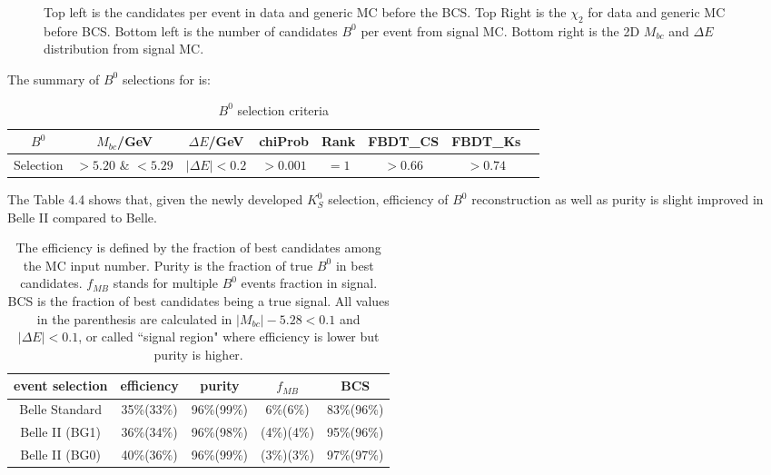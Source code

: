 \begin{figure}[H]
\begin{minipage}[b]{0.5\linewidth}
	\end{minipage}
	
	\caption{Top left is the candidates per event in data and generic MC before the BCS. Top Right is the $\chi_2$ for data and generic MC before BCS. Bottom left is the number of candidates $B^0$ per event from signal MC. Bottom right is the 2D $M_{bc}$ and $\Delta E$ distribution from signal MC.}
	\label{fig:b0dist}
\end{figure}


The summary of $B^0$ selections for is:
\begin{table}[H]
	\centering 
	\begin{tabular}{|c|c|c|c|c|c|c|c|} 
		\hline
		$B^0$  & $M_{bc}$/GeV& $\Delta E$/GeV & chiProb & Rank & FBDT\_CS & FBDT\_Ks\\
		\hline
		Selection & $> 5.20$ \& $< 5.29$  &  $ |\Delta E|< 0.2$ & $> 0.001$  & $=1$ & $>0.66$ & $>0.74$\\
		\hline
	\end{tabular}
	\caption{$B^0$ selection criteria}
\end{table}

The Table 4.4 shows that, given the newly developed $K_S^0$ selection, efficiency of $B^0$ reconstruction as well as purity is slight improved in Belle II compared to Belle.
\begin{table}[H]
	\centering
	\begin{tabular}{c|c|c|c|c}
		\hline
		event selection & efficiency & purity  & $f_{MB}$  & BCS \\
		\hline
		\hline
		Belle Standard & 35\%(33\%) & 96\%(99\%) & 6\%(6\%) & 83\%(96\%)\\
		\hline 
		Belle II (BG1) & 36\%(34\%) & 96\%(98\%) & (4\%)(4\%) & 95\%(96\%)\\
		\hline
		Belle II (BG0) & 40\%(36\%) & 96\%(99\%) & (3\%)(3\%) & 97\%(97\%)\\
		\hline
	\end{tabular}
	\caption{The efficiency is defined by the fraction of best candidates among the MC input number. Purity is the fraction of true $B^0$ in best candidates. $f_{MB}$ stands for multiple $B^0$ events fraction in signal. BCS is the fraction of best candidates being a true signal. All values in the parenthesis are calculated in $| M_{bc} |- 5.28 < 0.1$ and $|\Delta E| < 0.1$, or called ``signal region" where efficiency is lower but purity is higher. }
\end{table}

